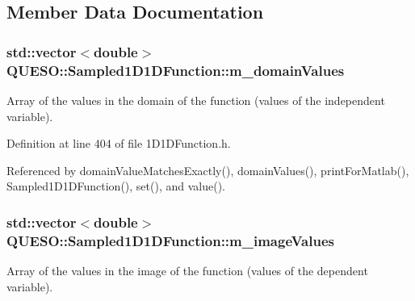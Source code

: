 \subsection{Member Data Documentation}
\hypertarget{class_q_u_e_s_o_1_1_sampled1_d1_d_function_a6985db1a50a72a3fb1377645ac6cd944}{
\subsubsection[{m\-\_\-domain\-Values}]{\setlength{\rightskip}{0pt plus 5cm}std\-::vector$<$double$>$ Q\-U\-E\-S\-O\-::\-Sampled1\-D1\-D\-Function\-::m\-\_\-domain\-Values\hspace{0.3cm}{\ttfamily [protected]}}}\label{class_q_u_e_s_o_1_1_sampled1_d1_d_function_a6985db1a50a72a3fb1377645ac6cd944}


Array of the values in the domain of the function (values of the independent variable). 



Definition at line 404 of file 1\-D1\-D\-Function.\-h.



Referenced by domain\-Value\-Matches\-Exactly(), domain\-Values(), print\-For\-Matlab(), Sampled1\-D1\-D\-Function(), set(), and value().

\hypertarget{class_q_u_e_s_o_1_1_sampled1_d1_d_function_a5569dd39ba1eb7183b608b59e4919a6f}{
\subsubsection[{m\-\_\-image\-Values}]{\setlength{\rightskip}{0pt plus 5cm}std\-::vector$<$double$>$ Q\-U\-E\-S\-O\-::\-Sampled1\-D1\-D\-Function\-::m\-\_\-image\-Values\hspace{0.3cm}{\ttfamily [protected]}}}\label{class_q_u_e_s_o_1_1_sampled1_d1_d_function_a5569dd39ba1eb7183b608b59e4919a6f}


Array of the values in the image of the function (values of the dependent variable). 



